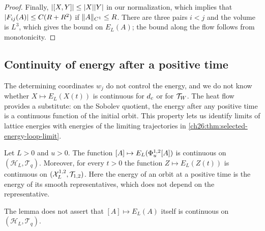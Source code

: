 \begin{proof}
Finally, $\lvert [X,Y]\rvert\le\lvert X\rvert\lvert Y\rvert$ in our normalization, which implies that $\lvert F_{ij}(A)\rvert\le C(R+R^2)$ if $\lVert A\rVert_{C^1}\le R$. There are three pairs $i<j$ and the volume is $L^3$, which gives the bound on $E_L(A)$; the bound along the flow follows from monotonicity.
\end{proof}

\subsection{Continuity of energy after a positive time}

The determining coordinates $w_j$ do not control the energy, and we do not know whether $X\mapsto E_L(X(t))$ is continuous for $d_c$ or for $\mathcal T_W$. The heat flow provides a substitute: on the Sobolev quotient, the energy after any positive time is a continuous function of the initial orbit. This property lets us identify limits of lattice energies with energies of the limiting trajectories in \cref{ch26:thm:selected-energy-loop-limit}.

\begin{lemma}\label{ch26:lem:sobolev-positive-time-energy}
Let $L>0$ and $u>0$. The function $[A]\mapsto E_L(\Phi^{1,2}_u[A])$ is continuous on $(\mathcal H_L,\mathcal T_q)$. Moreover, for every $t>0$ the function $Z\mapsto E_L(Z(t))$ is continuous on $(\mathcal X_L^{1,2},\mathcal T_{1,2})$. Here the energy of an orbit at a positive time is the energy of its smooth representatives, which does not depend on the representative.
\end{lemma}

The lemma does not assert that $[A]\mapsto E_L(A)$ itself is continuous on $(\mathcal H_L,\mathcal T_q)$.

